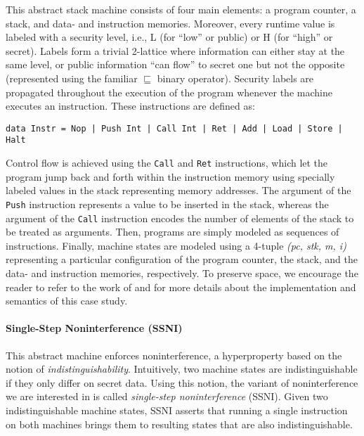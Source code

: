 \documentclass[sigconf,review,anonymous]{acmart}
\begin{document}
This abstract stack machine consists of four main elements: a program counter, a
stack, and data- and instruction memories.
%
Moreover, every runtime value is labeled with a security level, i.e., L (for
``low'' or public) or H (for ``high'' or secret).
%
Labels form a trivial 2-lattice where information can either stay at the same
level, or public information ``can flow'' to secret one but not the opposite
(represented using the familiar $\sqsubseteq$ binary operator).
%
Security labels are propagated throughout the execution of the program whenever
the machine executes an instruction.
%
These instructions are defined as:
%
\begin{verbatim}
data Instr = Nop | Push Int | Call Int | Ret | Add | Load | Store | Halt
\end{verbatim}

\noindent Control flow is achieved using the \texttt{Call} and \texttt{Ret}
instructions, which let the program jump back and forth within the instruction
memory using specially labeled values in the stack representing memory
addresses.
%
The argument of the \texttt{Push} instruction represents a value to be inserted
in the stack, whereas the argument of the \texttt{Call} instruction encodes the
number of elements of the stack to be treated as arguments.
%
Then, programs are simply modeled as sequences of instructions.
%
Finally, machine states are modeled using a 4-tuple \textit{(pc, stk, m, i)}
representing a particular configuration of the program counter, the stack, and
the data- and instruction memories, respectively.
%
To preserve space, we encourage the reader to refer to the work of
\citeauthor{hritcu2013testing} \citeyearpar{hritcu2013testing,
  hrictcu2016testing} and \citeauthor{lampropoulos2019coverage} for more details
about the implementation and semantics of this case study.

\paragraph{Single-Step Noninterference (SSNI)}

This abstract machine enforces noninterference, a hyperproperty based on the
notion of \emph{indistinguishability}.
%
Intuitively, two machine states are indistinguishable if they only differ on
secret data.
%
Using this notion, the variant of noninterference we are interested in is called
\emph{single-step noninterference} \cite{hritcu2013testing} (SSNI).
%
Given two indistinguishable machine states, SSNI asserts that running a single
instruction on both machines brings them to resulting states that are also
indistinguishable.
\end{document}
